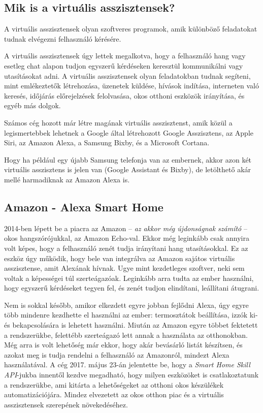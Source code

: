 \documentclass[
]{thesis-ekf}
\theoremstyle{definition}
\theoremstyle{remark}
\begin{document}
	\subsection{Mik is a virtuális asszisztensek?}
	A virtuális asszisztensek olyan szoftveres programok, amik különböző feladatokat tudnak elvégezni felhasználó kérésére.
	
	A virtuális asszisztensek úgy lettek megalkotva, hogy a felhasználó hang vagy esetleg chat alapon tudjon egyszerű kérdéseken keresztül kommunikálni vagy utasításokat adni. A virtuális asszisztensek olyan feladatokban tudnak segíteni, mint emlékeztetők létrehozása, üzenetek küldése, hívások indítása, interneten való keresés, időjárás előrejelzések felolvasása, okos otthoni eszközök irányítása, és egyéb más dolgok. 
	
	Számos cég hozott már létre magának virtuális asszisztenst, amik közül a legismertebbek lehetnek a Google által létrehozott Google Asszisztens, az Apple Siri, az Amazon Alexa, a Samsung Bixby, és a Microsoft Cortana.
	
	Hogy ha például egy újabb Samsung telefonja van az embernek, akkor azon két virtuális asszisztens is jelen van (Google Assistant és Bixby), de letölthető akár mellé harmadiknak az Amazon Alexa is.
	
	\subsection{Amazon - Alexa Smart Home}
	2014-ben lépett be a piacra az Amazon -- \emph{az akkor még újdonságnak számító} -- okos hangszórójukkal, az Amazon Echo-val. Ekkor még leginkább csak annyira volt képes, hogy a felhasználó zenét tudja irányítani hang utasításokkal. Ez az eszköz úgy működik, hogy bele van integrálva az Amazon sajátos virtuális asszisztense, amit Alexának hívnak. Ugye mint kezdetleges szoftver, neki sem voltak a képességei túl szerteágazóak. Leginkább arra tudta az ember használni, hogy egyszerű kérdéseket tegyen fel, és zenét tudjon elindítani, leállítani átugrani.
	
	Nem is sokkal később, amikor elkezdett egyre jobban fejlődni Alexa, úgy egyre több mindenre kezdhette el használni az ember: termosztátok beállítása, izzók ki- és bekapcsolására is lehetett használni. Miután az Amazon egyre többet fektetett a rendszerükbe, felettébb szerteágazó lett annak a használata az otthonokban. Még arra is volt lehetőség már ekkor, hogy akár bevásárló listát készítsen, és azokat meg is tudja rendelni a felhasználó az Amazonról, mindezt Alexa használatával. A cég 2017. május 23-án jelentette be, hogy a \emph{Smart Home Skill API}-jukba\cite{amazon-api} innentől kezdve megadható, hogy milyen eszközöket is csatlakoztatunk a rendszerükbe, ami kitárta a lehetőségeket az otthoni okos készülékek automatizációjára. Mindez elvezetett az okos otthon piac és a virtuális asszisztensek szerepének növekedéséhez.
	
\end{document}
